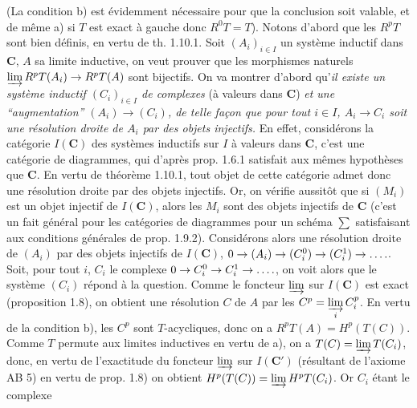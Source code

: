 (La condition b) est évidemment nécessaire pour que la conclusion soit
valable, et de même a) si $T$ est exact à gauche donc $R^0T=T$). Notons
d'abord que les $R^pT$ sont bien définis, en vertu de th. 1.10.1. Soit
$(A_i)_{i\in I}$ un système inductif dans $\mathbf C$, $A$ sa limite inductive, on veut
prouver que les morphismes naturels
$\varinjlim R^pT(A_i)\to R^pT(A)$
sont bijectifs.
On va montrer d'abord qu'\textit{il existe un système inductif $(C_i)_{i\in I}$ de
complexes }(à valeurs dans $\mathbf C$)\textit{ et une ``augmentation''
$(A_i)\to(C_i)$, de telle façon que pour tout $i\in I$,
$A_i\to C_i$ soit une résolution droite de $A_i$ par des objets
injectifs.}
En effet, considérons la catégorie $I(\mathbf C)$ des systèmes inductifs sur $I$ à
valeurs dans $\mathbf C$, c'est une catégorie de diagrammes, qui d'après prop. 1.6.1
satisfait aux mêmes hypothèses que $\mathbf C$. En vertu de théorème 1.10.1, tout objet
de cette catégorie admet donc une résolution droite par des objets injectifs.
Or, on vérifie aussitôt que si $(M_i)$ est un objet injectif de $I(\mathbf C)$, alors
les $M_i$ sont des objets injectifs de $\mathbf C$ (c'est un fait général pour les
catégories de diagrammes pour un schéma $\displaystyle\sum$ satisfaisant aux conditions
générales de prop. 1.9.2). Considérons alors une résolution droite de $(A_i)$ par des objets injectifs de
$I(\mathbf C)$,
$0\to(A_i)\to(C_i^0)\to(C_i^1)\to\mathinner{.\,.\,.\,.}$.
Soit, pour tout $i$, $C_i$ le complexe
$0\to C_i^0\to C_i^1\to\mathinner{.\,.\,.\,.}$,
on voit alors que le système $(C_i)$ répond à la question.
Comme le foncteur $\varinjlim$ sur $I(\mathbf C)$ est exact (proposition 1.8), on
obtient une résolution $C$ de $A$ par les
$C^p=\varinjlim\limits_i C_i^p$.
En vertu de la condition b), les $C^p$ sont $T$-acycliques, donc on a
$R^pT(A)=H^p(T(C))$.
Comme $T$ permute aux limites inductives en vertu de a), on a
$T(C)=\varinjlim T(C_i)$,
donc, en vertu de l'exactitude du foncteur $\varinjlim$ sur $I(\mathbf C')$
(résultant de l'axiome AB 5) en vertu de prop. 1.8) on obtient
$H^p(T(C))=\varinjlim H^pT(C_i)$.
Or $C_i$ étant le complexe

